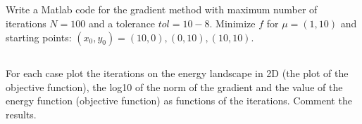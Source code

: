 \documentclass[unicode,11pt,a4paper,oneside,numbers=endperiod,openany]{scrartcl}
\begin{document}
\subsection{}
Write a Matlab code for the gradient method with maximum number of iterations $N = 100$ and a tolerance $tol = 10-8$. 
Minimize $f$ for $\mu = (1, 10)$ and starting points: $(x_0 , y_0) = (10, 0), (0, 10), (10, 10)$.



\subsection{}
For each case plot the iterations on the energy landscape in 2D (the plot of the objective function),
the log10 of the norm of the gradient and the value of the energy function (objective function) as functions of the iterations. 
Comment the results.
\end{document}
